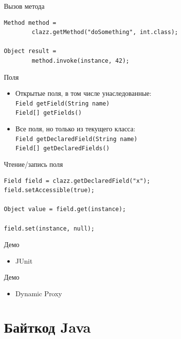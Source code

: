 \documentclass[unicode]{beamer}
\begin{document}
\begin{frame}[fragile]{Вызов метода}
\begin{lstlisting}
Method method =
        clazz.getMethod("doSomething", int.class);

Object result =
        method.invoke(instance, 42);
\end{lstlisting}
\end{frame}


\begin{frame}{Поля}
\begin{itemize}
\item Открытые поля, в том числе унаследованные:\\
    \lstinline|Field getField(String name)|\\
    \lstinline|Field[] getFields()|
    \bigskip

\item Все поля, но только из текущего класса:\\
    \lstinline|Field getDeclaredField(String name)|\\
    \lstinline|Field[] getDeclaredFields()|
\end{itemize}
\end{frame}


\begin{frame}[fragile]{Чтение/запись поля}
\begin{lstlisting}
Field field = clazz.getDeclaredField("x");
field.setAccessible(true);

Object value = field.get(instance);

field.set(instance, null);
\end{lstlisting}
\end{frame}


\begin{frame}{Демо}
\begin{itemize}
\item JUnit
\end{itemize}
\end{frame}


\begin{frame}{Демо}
\begin{itemize}
\item Dynamic Proxy
\end{itemize}
\end{frame}



\section{Байткод Java}
\end{document}
